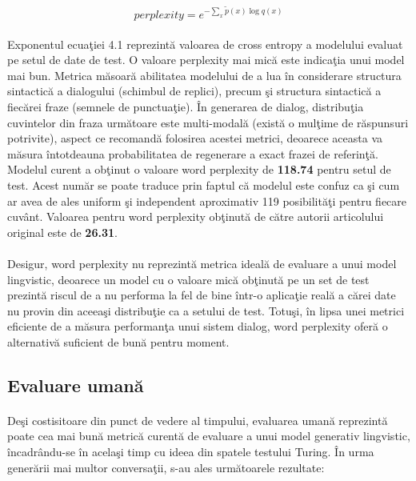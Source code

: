 \begin{equation}
perplexity = e^{-\sum_{x}\tilde{p}(x)\log{q(x)}}
\end{equation}

\paragraph{}
Exponentul ecua\c tiei 4.1 reprezint\u a valoarea de cross entropy a modelului evaluat pe setul de date de test. O valoare perplexity mai mic\u a este indica\c tia unui model mai bun. Metrica m\u asoar\u a abilitatea modelului de a lua \^ in considerare structura sintactic\u a a dialogului (schimbul de replici), precum \c si structura sintactic\u a a fiec\u arei fraze (semnele de punctua\c tie). \^ In generarea de dialog, distribu\c tia cuvintelor din fraza urm\u atoare este multi-modal\u a (exist\u a o mul\c time de r\u aspunsuri potrivite), aspect ce recomand\u a folosirea acestei metrici, deoarece aceasta va m\u asura \^ intotdeauna probabilitatea de regenerare a exact frazei de referin\c t\u a. Modelul curent a ob\c tinut o valoare word perplexity de \textbf{118.74} pentru setul de test. Acest num\u ar se poate traduce prin faptul c\u a modelul este confuz ca \c si cum ar avea de ales uniform \c si independent aproximativ 119 posibilit\u a\c ti pentru fiecare cuv\^ ant. Valoarea pentru word perplexity ob\c tinut\u a de c\u atre autorii articolului original este de \textbf{26.31}.

\paragraph{}
Desigur, word perplexity nu reprezint\u a metrica ideal\u a de evaluare a unui model lingvistic, deoarece un model cu o valoare mic\u a ob\c tinut\u a pe un set de test prezint\u a riscul de a nu performa la fel de bine \^ intr-o aplica\c tie real\u a a c\u arei date nu provin din aceea\c si distribu\c tie ca a setului de test. Totu\c si, \^ in lipsa unei metrici eficiente de a m\u asura performan\c ta unui sistem dialog, word perplexity ofer\u a o alternativ\u a suficient de bun\u a pentru moment.

\subsection{Evaluare uman\u a}

\paragraph{}
De\c si costisitoare din punct de vedere al timpului, evaluarea uman\u a reprezint\u a poate cea mai bun\u a metric\u a curent\u a de evaluare a unui model generativ lingvistic, \^ incadr\^ andu-se \^ in acela\c si timp cu ideea din spatele testului Turing. \^ In urma gener\u arii mai multor conversa\c tii, s-au ales urm\u atoarele rezultate:

